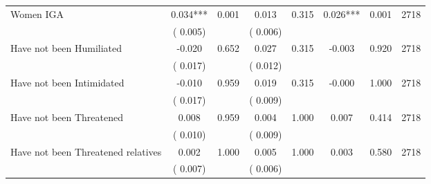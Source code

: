 \begin{tabular}{l*{7}{c}}
 Women IGA       &              0.034***       &        0.001  &              0.013       &        0.315  &              0.026***       &              0.001 &  2718 \\ 
                       &       (       0.005)             &                               &       (       0.006)                     &                               &                                               &                                &                      \\ 

 Have not been Humiliated       &             -0.020       &        0.652  &              0.027       &        0.315  &             -0.003       &              0.920 &  2718 \\ 
                       &       (       0.017)             &                               &       (       0.012)                     &                               &                                               &                                &                      \\ 

 Have not been Intimidated       &             -0.010       &        0.959  &              0.019       &        0.315  &             -0.000       &              1.000 &  2718 \\ 
                       &       (       0.017)             &                               &       (       0.009)                     &                               &                                               &                                &                      \\ 

 Have not been Threatened       &              0.008       &        0.959  &              0.004       &        1.000  &              0.007       &              0.414 &  2718 \\ 
                       &       (       0.010)             &                               &       (       0.009)                     &                               &                                               &                                &                      \\ 

 Have not been Threatened relatives       &              0.002       &        1.000  &              0.005       &        1.000  &              0.003       &              0.580 &  2718 \\ 
                       &       (       0.007)             &                               &       (       0.006)                     &                               &                                               &                                &                      \\ 


\end{tabular}
